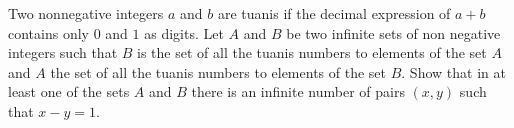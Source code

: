 Two nonnegative integers $a$ and $b$ are tuanis if the decimal expression of $a+b$ contains only $0$ and $1$ as digits. Let $A$ and $B$ be two infinite sets of non negative integers such that $B$ is the set of all the tuanis numbers to elements of the set $A$ and $A$ the set of all the tuanis numbers to elements of the set $B$. Show that in at least one of the sets $A$ and $B$ there is an infinite number of pairs $(x,y)$ such that $x-y=1$.